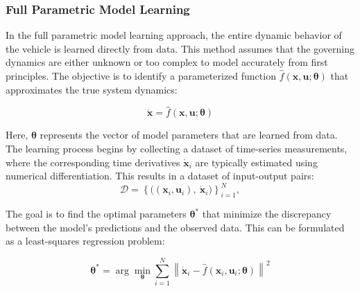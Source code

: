 \subsubsection{Full Parametric Model Learning}

In the full parametric model learning approach, the entire dynamic behavior of the vehicle is learned directly from data. This method assumes that the governing dynamics are either unknown or too complex to model accurately from first principles. The objective is to identify a parameterized function $\hat{f}(\boldsymbol{x}, \mathbf{u}; \boldsymbol{\theta})$ that approximates the true system dynamics:

\begin{equation}
    \dot{\boldsymbol{x}} = \hat{f}(\boldsymbol{x}, \mathbf{u}; \boldsymbol{\theta})
\end{equation}

Here, $\boldsymbol{\theta}$ represents the vector of model parameters that are learned from data. The learning process begins by collecting a dataset of time-series measurements, where the corresponding time derivatives $\dot{\boldsymbol{x}}_i$ are typically estimated using numerical differentiation. This results in a dataset of input-output pairs:
\[
\mathcal{D} = \left\{ \big((\boldsymbol{x}_i, \mathbf{u}_i),\ \dot{\boldsymbol{x}}_i \big) \right\}_{i=1}^N,
\]



The goal is to find the optimal parameters $\boldsymbol{\theta}^*$ that minimize the discrepancy between the model's predictions and the observed data. This can be formulated as a least-squares regression problem:

\begin{equation}
    \boldsymbol{\theta}^* = \arg \min_{\boldsymbol{\theta}} \sum_{i=1}^N \left\| \dot{\boldsymbol{x}}_i - \hat{f}(\boldsymbol{x}_i, \mathbf{u}_i; \boldsymbol{\theta}) \right\|^2
\end{equation}

